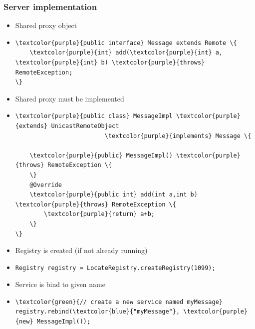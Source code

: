 \documentclass[10pt,xcolor=pdflatex]{beamer}
\begin{document}
\begin{frame}[containsverbatim]\frametitle{Server implementation}
\begin{itemize}
	\item Shared proxy object
  	\item[]  \begin{Verbatim}[fontsize=\footnotesize, commandchars=\\\{\}]
\textcolor{purple}{public interface} Message extends Remote \{
    \textcolor{purple}{int} add(\textcolor{purple}{int} a, \textcolor{purple}{int} b) \textcolor{purple}{throws} RemoteException;
\}    	
\end{Verbatim} 
	\item Shared proxy must be implemented
  	\item[]  \begin{Verbatim}[fontsize=\footnotesize, commandchars=\\\{\}]
\textcolor{purple}{public class} MessageImpl \textcolor{purple}{extends} UnicastRemoteObject 
                         \textcolor{purple}{implements} Message \{

    \textcolor{purple}{public} MessageImpl() \textcolor{purple}{throws} RemoteException \{        
    \}
    @Override
    \textcolor{purple}{public int} add(int a,int b) \textcolor{purple}{throws} RemoteException \{
        \textcolor{purple}{return} a+b;
    \}
\}
\end{Verbatim} 
    \item Registry is created (if not already running)
    \item[]\begin{Verbatim}[fontsize=\footnotesize, commandchars=\\\{\}]
Registry registry = LocateRegistry.createRegistry(1099);
\end{Verbatim}
    \item Service is bind to given name     
    \item[]\begin{Verbatim}[fontsize=\footnotesize, commandchars=\\\{\}]
\textcolor{green}{// create a new service named myMessage}
registry.rebind(\textcolor{blue}{"myMessage"}, \textcolor{purple}{new} MessageImpl());
\end{Verbatim}
\end{itemize}
\end{frame}
\end{document}
